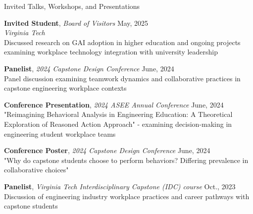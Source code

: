 \documentclass{resume}
\begin{document}
\begin{rSection}{Invited Talks, Workshops, and Presentations}


{\bf Invited Student}{, \emph{Board of Visitors}} {\hfill May, 2025} \\
\emph{Virginia Tech}\\
Discussed research on GAI adoption in higher education and ongoing projects examining workplace technology integration with university leadership

{\bf Panelist}{, \emph{2024 Capstone Design Conference}} {\hfill June, 2024} \\
Panel discussion examining teamwork dynamics and collaborative practices in capstone engineering workplace contexts

{\bf Conference Presentation}{, \emph{2024 ASEE Annual Conference}} {\hfill June, 2024} \\
"Reimagining Behavioral Analysis in Engineering Education: A Theoretical Exploration of Reasoned Action Approach" - examining decision-making in engineering student workplace teams

{\bf Conference Poster}{, \emph{2024 Capstone Design Conference}} {\hfill June, 2024} \\
"Why do capstone students choose to perform behaviors? Differing prevalence in collaborative choices"

{\bf Panelist}{, \emph{Virginia Tech Interdisciplinary Capstone (IDC) course}} {\hfill Oct., 2023} \\
Discussion of engineering industry workplace practices and career pathways with capstone students
\vspace{-0.5em}

\end{rSection}

\end{document}
